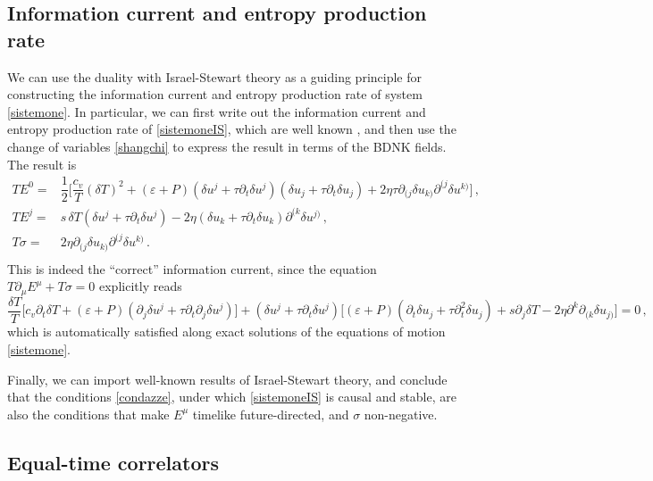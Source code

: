 \documentclass[a4paper, amsfonts, amssymb, amsmath, reprint, showkeys, nofootinbib, twoside,notitlepage,onecolumn,preprintnumbers]{revtex4-2}
\theoremstyle{definition}
\theoremstyle{theorem}
\theoremstyle{corollary}
\begin{document}
\subsection{Information current and entropy production rate}

We can use the duality with Israel-Stewart theory as a guiding principle for constructing the information current and entropy production rate of system \eqref{sistemone}. In particular, we can first write out the information current and entropy production rate of \eqref{sistemoneIS}, which are well known \cite{GavassinoUniversality2023}, and then use the change of variables \eqref{shangchi} to express the result in terms of the BDNK fields. The result is
\begin{equation}\label{INFOONA3}
\begin{split}
TE^0 ={}& \dfrac{1}{2} \bigg[ \dfrac{c_v}{T} (\delta T)^2 +(\varepsilon{+}P)(\delta u^j{+}\tau \partial_t \delta u^j)(\delta u_j{+}\tau \partial_t  \delta u_j) +2\eta \tau \partial_{(j}\delta u_{k)} \partial^{(j}\delta u^{k)} \bigg] \, ,\\
TE^j ={}& s \, \delta T (\delta u^j{+}\tau \partial_t \delta u^j)-2\eta (\delta u_k {+}\tau \partial_t \delta u_k)\partial^{(k}\delta u^{j)} \, ,\\
T\sigma ={}& 2\eta \partial_{(j}\delta u_{k)} \partial^{(j}\delta u^{k)} \, . \\
\end{split}
\end{equation}
This is indeed the ``correct'' information current, since the equation $T\partial_\mu E^\mu +T\sigma=0$ explicitly reads
\begin{equation}
\dfrac{\delta T}{T} \big[c_v \partial_t \delta T +(\varepsilon{+}P)(\partial_j \delta u^j {+}\tau \partial_t \partial_j \delta u^j ) \big]+(\delta u^j{+}\tau \partial_t \delta u^j)\big[ (\varepsilon{+}P)(\partial_t \delta u_j{+}\tau \partial_t^2 \delta u_j)+s\partial_j \delta T -2 \eta \partial^k \partial_{(k}\delta u_{j)} \big]=0 \, ,
\end{equation}
which is automatically satisfied along exact solutions of the equations of motion \eqref{sistemone}. 

Finally, we can import well-known results of Israel-Stewart theory, and conclude that the conditions \eqref{condazze}, under which \eqref{sistemoneIS} is causal and stable, are also the conditions that make $E^\mu$ timelike future-directed, and $\sigma$ non-negative. 

\subsection{Equal-time correlators}
\end{document}
